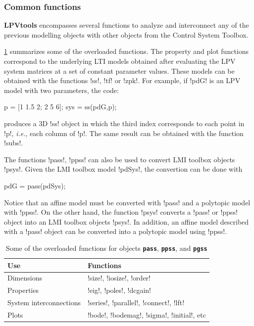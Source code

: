 \documentclass[fleqn,11pt]{article}
\newcommand{\lcode}[1]{\textbf{%
    \lstinline[style=mystyle]{#1}}}
\newcommand{\lpvtool}{\textbf{LPVtools}\xspace}
\newcommand{\ie}{{\em i.e.}\xspace}
\begin{document}
\subsubsection{Common functions}\label{sssec:sysCommon}

\lpvtool encompasses several functions to analyze and interconnect any of the previous modelling objects with other objects from the Control System Toolbox.

\cref{tab:overfcn} summarizes some of the overloaded functions. The property and plot functions correspond to the underlying LTI models obtained after evaluating the LPV system matrices at a set of constant parameter values. These models can be obtained with the functions !ss!, !tf! or !zpk!. For example, if !pdG! is an LPV model with two parameters, the code:
\begin{code}
p = [1 1.5 2; 2 5 6];
sys = ss(pdG,p);
\end{code}
produces a 3D !ss! object in which the third index corresponds to each point in !p!, \ie, each column of !p!. The same result can be obtained with the function !subs!.

The functions !pass!, !ppss! can also be used to convert LMI toolbox objects !psys!. Given the LMI toolbox model !pdSys!, the convertion can be done with
\begin{code}
pdG = pass(pdSys);
\end{code}
Notice that an affine model must be converted with !pass! and a polytopic model with !ppss!. On the other hand, the function !psys! converts a !pass! or !ppss! object into an LMI toolbox objects !psys!. In addition, an affine model described with a !pass! object can be converted into a polytopic model using !ppss!.

\begin{table}
    \centering
    \begin{tabular}{p{}p{}}
      \toprule
      Use & Functions \\
      \midrule
      Dimensions & !size!, !iosize!, !order!  \\
      Properties & !eig!, !poles!, !dcgain! \\
      System interconnections & !series!, !parallel!, !connect!, !lft!\\
      Plots & !bode!, !bodemag!, !sigma!, !initial!, etc\\
      \bottomrule
    \end{tabular}
    \caption{Some of the overloaded functions for objects \lcode{pass}, \lcode{ppss}, and \lcode{pgss}}\label{tab:overfcn}
\end{table}
\end{document}
